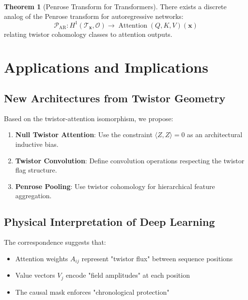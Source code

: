 \documentclass[12pt,a4paper]{article}
\theoremstyle{definition}
\newtheorem{theorem}{Theorem}[section]
\DeclareMathOperator{\Attention}{Attention}
\begin{document}
\begin{theorem}[Penrose Transform for Transformers]
There exists a discrete analog of the Penrose transform for autoregressive networks:
\begin{equation}
\mathcal{P}_{\text{AR}}: H^1(\mathcal{T}_\mathbf{x}, \mathcal{O}) \to \Attention(Q, K, V)(\mathbf{x})
\end{equation}
relating twistor cohomology classes to attention outputs.
\end{theorem}

\section{Applications and Implications}

\subsection{New Architectures from Twistor Geometry}

Based on the twistor-attention isomorphism, we propose:

\begin{enumerate}
\item \textbf{Null Twistor Attention}: Use the constraint $\langle Z, Z \rangle = 0$ as an architectural inductive bias.

\item \textbf{Twistor Convolution}: Define convolution operations respecting the twistor flag structure.

\item \textbf{Penrose Pooling}: Use twistor cohomology for hierarchical feature aggregation.
\end{enumerate}

\subsection{Physical Interpretation of Deep Learning}

The correspondence suggests that:
\begin{itemize}
\item Attention weights $A_{ij}$ represent "twistor flux" between sequence positions
\item Value vectors $V_j$ encode "field amplitudes" at each position
\item The causal mask enforces "chronological protection"
\end{itemize}
\end{document}
